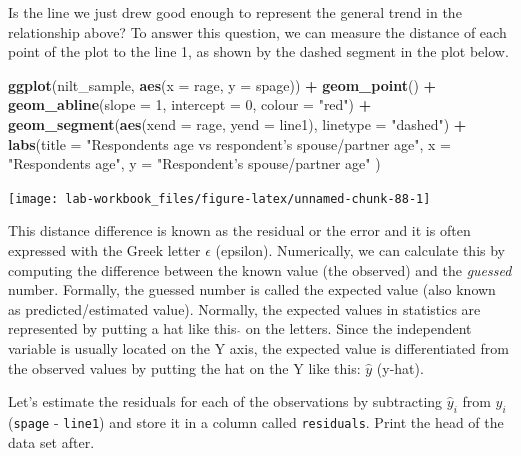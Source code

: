 \documentclass[
]{book}
\newenvironment{Shaded}{\begin{snugshade}}{\end{snugshade}}
\newcommand{\AttributeTok}[1]{\textcolor[rgb]{0.13,0.29,0.53}{#1}}
\newcommand{\DecValTok}[1]{\textcolor[rgb]{0.00,0.00,0.81}{#1}}
\newcommand{\FunctionTok}[1]{\textcolor[rgb]{0.13,0.29,0.53}{\textbf{#1}}}
\newcommand{\NormalTok}[1]{#1}
\newcommand{\SpecialCharTok}[1]{\textcolor[rgb]{0.81,0.36,0.00}{\textbf{#1}}}
\newcommand{\StringTok}[1]{\textcolor[rgb]{0.31,0.60,0.02}{#1}}
\begin{document}
Is the line we just drew good enough to represent the general trend in the relationship above? To answer this question, we can measure the distance of each point of the plot to the line 1, as shown by the dashed segment in the plot below.

\begin{Shaded}
\begin{Highlighting}[]
\FunctionTok{ggplot}\NormalTok{(nilt\_sample, }\FunctionTok{aes}\NormalTok{(}\AttributeTok{x =}\NormalTok{ rage, }\AttributeTok{y =}\NormalTok{ spage)) }\SpecialCharTok{+} 
  \FunctionTok{geom\_point}\NormalTok{() }\SpecialCharTok{+}
  \FunctionTok{geom\_abline}\NormalTok{(}\AttributeTok{slope =} \DecValTok{1}\NormalTok{, }\AttributeTok{intercept =} \DecValTok{0}\NormalTok{, }\AttributeTok{colour =} \StringTok{"red"}\NormalTok{) }\SpecialCharTok{+}
  \FunctionTok{geom\_segment}\NormalTok{(}\FunctionTok{aes}\NormalTok{(}\AttributeTok{xend =}\NormalTok{ rage, }\AttributeTok{yend =}\NormalTok{ line1), }\AttributeTok{linetype =} \StringTok{"dashed"}\NormalTok{) }\SpecialCharTok{+}
   \FunctionTok{labs}\NormalTok{(}\AttributeTok{title =} \StringTok{"Respondent\textquotesingle{}s age vs respondent’s spouse/partner age"}\NormalTok{, }
       \AttributeTok{x =} \StringTok{"Respondent\textquotesingle{}s age"}\NormalTok{, }\AttributeTok{y =} \StringTok{"Respondent’s spouse/partner age"}\NormalTok{ )}
\end{Highlighting}
\end{Shaded}

\begin{flushleft}\texttt{[image: lab-workbook\_files/figure-latex/unnamed-chunk-88-1]} \end{flushleft}

This distance difference is known as the residual or the error and it is often expressed with the Greek letter \(\epsilon\) (epsilon). Numerically, we can calculate this by computing the difference between the known value (the observed) and the \emph{guessed} number. Formally, the guessed number is called the expected value (also known as predicted/estimated value). Normally, the expected values in statistics are represented by putting a hat like this \(\hat{}\) on the letters. Since the independent variable is usually located on the Y axis, the expected value is differentiated from the observed values by putting the hat on the Y like this: \(\hat{y}\) (y-hat).

Let's estimate the residuals for each of the observations by subtracting \(\hat{y}_i\) from \(y_i\) (\texttt{spage} - \texttt{line1}) and store it in a column called \texttt{residuals}. Print the head of the data set after.
\end{document}
